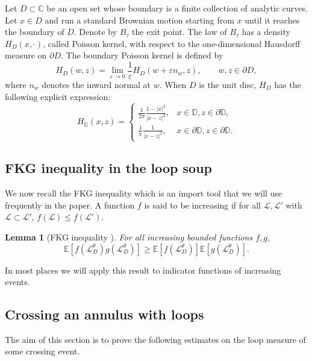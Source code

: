 \documentclass[11pt]{article}
\newtheorem{lemma}[theorem]{Lemma}
\theoremstyle{remark}
\newcommand{\C}{\mathbb{C}}
\newcommand{\D}{\mathbb{D}}
\newcommand{\Lc}{\mathcal{L}}
\newcommand{\Expect}[1]{\mathbb{E} \left[ #1 \right] }
\newcommand{\eps}{\varepsilon}
\numberwithin{equation}{section}
\begin{document}
Let $D \subset \C$ be an open set whose boundary is a finite collection of analytic curves. Let $x \in D$ and run a standard Brownian motion starting from $x$ until it reaches the boundary of $D$. Denote by $B_{\tau}$ the exit point. The law of $B_\tau$ has a density $H_D(x, \cdot)$, called Poisson kernel, with respect to the one-dimensional Hausdorff measure on $\partial D$.
The boundary Poisson kernel is defined by
\begin{equation}
\label{E:Poisson_boundary}
H_D(w,z) = \lim_{\eps \to 0} \frac{1}{\eps} H_D(w + \eps n_w, z), \quad \quad w,z \in \partial D,
\end{equation}
where $n_w$ denotes the inward normal at $w$.
When $D$ is the unit disc, $H_D$ has the following explicit expression:
\begin{equation}\label{E:Poisson_kernel_disc}
H_{\D}(x,z)
= \left\{ \begin{array}{cc}
\frac{1}{2\pi} \frac{1 - |x|^2}{|x - z|^2}, & x \in \D, z \in \partial \D, \\
\frac{1}{\pi} \frac{1}{|x - z|^2}, & x \in \partial \D, z \in \partial \D.
\end{array} \right.
\end{equation}



\subsection{FKG inequality in the loop soup}

We now recall the FKG inequality which is an import tool that we will use frequently in the paper.
A function $f$ is said to be increasing if for all $\Lc, \Lc'$ with $\Lc \subset \Lc'$, $f(\Lc) \leq f(\Lc')$.

\begin{lemma}[FKG inequality {\cite[Lemma 2.1]{Janson84}}]\label{L:FKG}
For all increasing bounded functions $f, g$,
\[
\Expect{ f(\Lc_D^\theta) g(\Lc_D^\theta) } \geq \Expect{ f(\Lc_D^\theta) } \Expect{ g(\Lc_D^\theta) }.
\]
\end{lemma}

In most places we will apply this result to indicator functions of increasing events. 


\subsection{Crossing an annulus with loops}


The aim of this section is to prove the following estimates on the loop measure of some crossing event.
\end{document}
